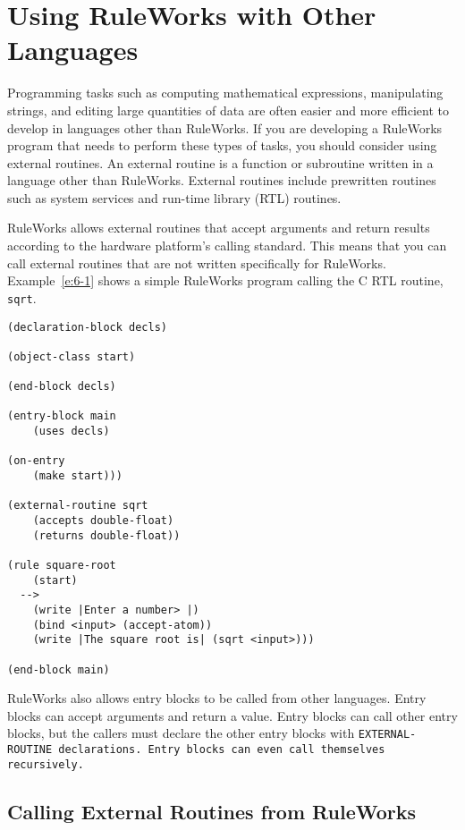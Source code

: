 \chapter{Using RuleWorks with Other Languages}
\label{c:otherlang}

Programming tasks such as computing mathematical expressions,
manipulating strings, and editing large quantities of data are often
easier and more efficient to develop in languages other than
RuleWorks. If you are developing a RuleWorks program that needs to
perform these types of tasks, you should consider using external
routines. An external routine is a function or subroutine written in a
language other than RuleWorks.  External routines include prewritten
routines such as system services and run-time library (RTL) routines.

RuleWorks allows external routines that accept arguments and return
results according to the hardware platform's calling standard. This
means that you can call external routines that are not written
specifically for RuleWorks. Example~\ref{e:6-1} shows a simple
RuleWorks program calling the C RTL routine, \verb|sqrt|.

\begin{exampl}
\begin{verbatim}
(declaration-block decls)

(object-class start)

(end-block decls)

(entry-block main
    (uses decls)

(on-entry
    (make start)))

(external-routine sqrt
    (accepts double-float)
    (returns double-float))

(rule square-root
    (start)
  -->
    (write |Enter a number> |)
    (bind <input> (accept-atom))
    (write |The square root is| (sqrt <input>)))

(end-block main)
\end{verbatim}
\label{e:6-1}
\end{exampl}

RuleWorks also allows entry blocks to be called from other
languages. Entry blocks can accept arguments and return a value. Entry
blocks can call other entry blocks, but the callers must declare the
other entry blocks with \tt{EXTERNAL-ROUTINE} declarations. Entry
blocks can even call themselves recursively.

\section{Calling External Routines from RuleWorks}
\label{s:calling}

